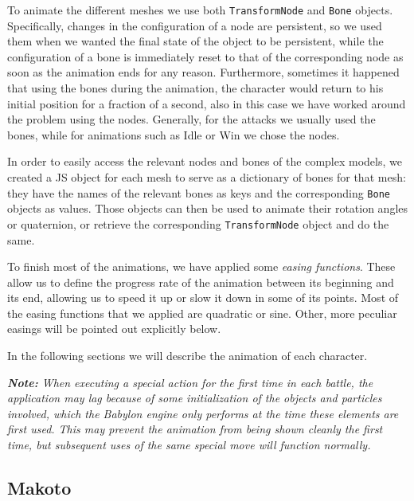 To animate the different meshes we use both \texttt{TransformNode} and \texttt{Bone} objects. Specifically, changes in the configuration of a node are persistent, so we used them when we wanted the final state of the object to be persistent, while the configuration of a bone is immediately reset to that of the corresponding node as soon as the animation ends for any reason. Furthermore, sometimes it happened that using the bones during the animation, the character would return to his initial position for a fraction of a second, also in this case we have worked around the problem using the nodes.
Generally, for the attacks we usually used the bones, while for animations such as Idle or Win we chose the nodes.

In order to easily access the relevant nodes and bones of the complex models, we created a JS object for each mesh to serve as a dictionary of bones for that mesh: they have the names of the relevant bones as keys and the corresponding \texttt{Bone} objects as values. Those objects can then be used to animate their rotation angles or quaternion, or retrieve the corresponding \texttt{TransformNode} object and do the same.

To finish most of the animations, we have applied some \textit{easing functions}. These allow us to define the progress rate of the animation between its beginning and its end, allowing us to speed it up or slow it down in some of its points. Most of the easing functions that we applied are quadratic or sine. Other, more peculiar easings will be pointed out explicitly below.

In the following sections we will describe the animation of each character.

\textit{\textbf{Note:} When executing a special action for the first time in each battle, the application may lag because of some initialization of the objects and particles involved, which the Babylon engine only performs at the time these elements are first used. This may prevent the animation from being shown cleanly the first time, but subsequent uses of the same special move will function normally.}



\subsection{Makoto}


